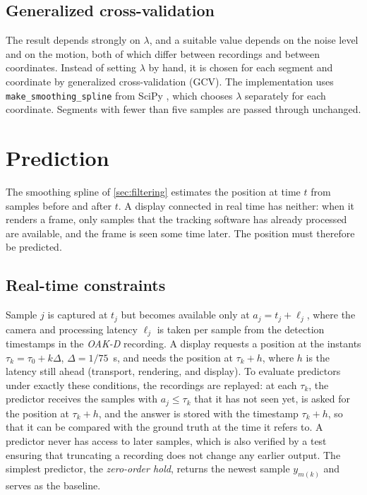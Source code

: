 \documentclass{siamart251216}
\begin{document}
\subsection{Generalized cross-validation}

The result depends strongly on $\lambda$, and a suitable value depends on the noise level and on the motion, both of which differ between recordings and between coordinates.
Instead of setting $\lambda$ by hand, it is chosen for each segment and coordinate by generalized cross-validation (GCV).
The implementation uses \texttt{make\_smoothing\_spline} from SciPy \cite{scipy2020}, which chooses $\lambda$ separately for each coordinate.
Segments with fewer than five samples are passed through unchanged.

\section{Prediction}
\label{sec:prediction}

The smoothing spline of \cref{sec:filtering} estimates the position at time $t$ from samples before and after $t$.
A display connected in real time has neither: when it renders a frame, only samples that the tracking software has already processed are available, and the frame is seen some time later.
The position must therefore be predicted.

\subsection{Real-time constraints}
\label{sec:real-time}

Sample $j$ is captured at $t_j$ but becomes available only at $a_j = t_j + \ell_j$, where the camera and processing latency $\ell_j$ is taken per sample from the detection timestamps in the \emph{OAK-D} recording.
A display requests a position at the instants $\tau_k = \tau_0 + k \Delta$, $\Delta = 1/75$~s, and needs the position at $\tau_k + h$, where $h$ is the latency still ahead (transport, rendering, and display).
To evaluate predictors under exactly these conditions, the recordings are replayed:
at each $\tau_k$, the predictor receives the samples with $a_j \leq \tau_k$ that it has not seen yet, is asked for the position at $\tau_k + h$, and the answer is stored with the timestamp $\tau_k + h$, so that it can be compared with the ground truth at the time it refers to.
A predictor never has access to later samples, which is also verified by a test ensuring that truncating a recording does not change any earlier output.
The simplest predictor, the \emph{zero-order hold}, returns the newest sample $y_{m(k)}$ and serves as the baseline.
\end{document}
